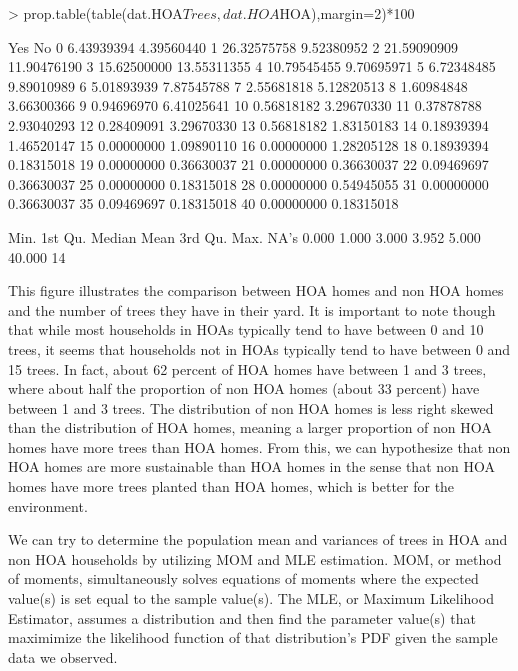 \documentclass{article}
\begin{document}
\begin{Schunk}
\begin{Sinput}
> prop.table(table(dat.HOA$Trees, dat.HOA$HOA),margin=2)*100
\end{Sinput}
\begin{Soutput}
             Yes          No
  0   6.43939394  4.39560440
  1  26.32575758  9.52380952
  2  21.59090909 11.90476190
  3  15.62500000 13.55311355
  4  10.79545455  9.70695971
  5   6.72348485  9.89010989
  6   5.01893939  7.87545788
  7   2.55681818  5.12820513
  8   1.60984848  3.66300366
  9   0.94696970  6.41025641
  10  0.56818182  3.29670330
  11  0.37878788  2.93040293
  12  0.28409091  3.29670330
  13  0.56818182  1.83150183
  14  0.18939394  1.46520147
  15  0.00000000  1.09890110
  16  0.00000000  1.28205128
  18  0.18939394  0.18315018
  19  0.00000000  0.36630037
  21  0.00000000  0.36630037
  22  0.09469697  0.36630037
  25  0.00000000  0.18315018
  28  0.00000000  0.54945055
  31  0.00000000  0.36630037
  35  0.09469697  0.18315018
  40  0.00000000  0.18315018
\end{Soutput}
\begin{Soutput}
   Min. 1st Qu.  Median    Mean 3rd Qu.    Max.    NA's 
  0.000   1.000   3.000   3.952   5.000  40.000      14 
\end{Soutput}
\end{Schunk}


This figure illustrates the comparison between HOA homes and non HOA homes and the number of trees they have in their yard. It is important to note though that while most households in HOAs typically tend to have between 0 and 10 trees, it seems that households not in HOAs typically tend to have between 0 and 15 trees. In fact, about 62 percent of HOA homes have between 1 and 3 trees, where about half the proportion of non HOA homes (about 33 percent) have between 1 and 3 trees. The distribution of non HOA homes is less right skewed than the distribution of HOA homes, meaning a larger proportion of non HOA homes have more trees than HOA homes. From this, we can hypothesize that non HOA homes are more sustainable than HOA homes in the sense that non HOA homes have more trees planted than HOA homes, which is better for the environment.

We can try to determine the population mean and variances of trees in HOA and non HOA households by utilizing MOM and MLE estimation. MOM, or method of moments, simultaneously solves equations of moments where the expected value(s) is set equal to the sample value(s). The MLE, or Maximum Likelihood Estimator, assumes a distribution and then find the parameter value(s) that maximimize the likelihood function of that distribution's PDF given the sample data we observed. 
\end{document}
